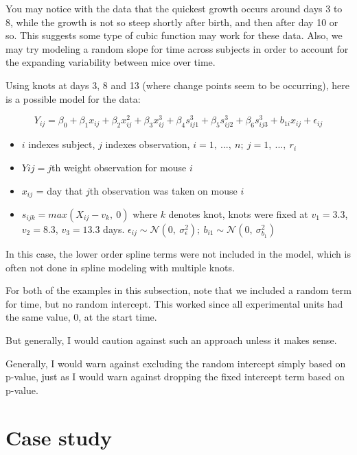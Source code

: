 \documentclass[
  9pt,
  ignorenonframetext,
]{beamer}
\providecommand{\tightlist}{%
  \setlength{\itemsep}{0pt}\setlength{\parskip}{0pt}}
\begin{document}
\begin{frame}{}
\protect\hypertarget{section-10}{}
You may notice with the data that the quickest growth occurs around days
3 to 8, while the growth is not so steep shortly after birth, and then
after day 10 or so. This suggests some type of cubic function may work
for these data. Also, we may try modeling a random slope for time across
subjects in order to account for the expanding variability between mice
over time.

Using knots at days 3, 8 and 13 (where change points seem to be
occurring), here is a possible model for the data:

\[Y_{ij}=\beta_0+\beta_1 x_{ij}+\beta_2 x_{ij}^2+\beta_3 x_{ij}^3+\beta_4 s_{ij1}^3+\beta_5 s_{ij2}^3+\beta_6 s_{ij3}^3+b_{1i} x_{ij}+\epsilon_{ij}\]

\begin{itemize}
\tightlist
\item
  \(i\) indexes subject, \(j\) indexes observation,
  \(i=1,\ ... ,\ n;\  j = 1,\ ... ,\ r_i\)
\item
  \(Y{ij} = j\)th weight observation for mouse \(i\)
\item
  \(x_{ij}\) = day that \(j\)th observation was taken on mouse \(i\)
\item
  \(s_{ijk} = max(X_{ij} - v_k,\ 0)\) where \(k\) denotes knot, knots
  were fixed at \(v_1=3.3\), \(v_2=8.3\), \(v_3=13.3\) days.
  \(\epsilon_{ij}\sim \mathcal N(0,\  \sigma_\epsilon^2);\ b_{i1}\sim \mathcal N(0,\  \sigma_{b_1}^2)\)
\end{itemize}
\end{frame}

\begin{frame}{}
\protect\hypertarget{section-11}{}
In this case, the lower order spline terms were not included in the
model, which is often not done in spline modeling with multiple knots.

For both of the examples in this subsection, note that we included a
random term for time, but no random intercept. This worked since all
experimental units had the same value, 0, at the start time.

But generally, I would caution against such an approach unless it makes
sense.

Generally, I would warn against excluding the random intercept simply
based on p-value, just as I would warn against dropping the fixed
intercept term based on p-value.
\end{frame}

\hypertarget{case-study}{%
\section{Case study}\label{case-study}}
\end{document}
